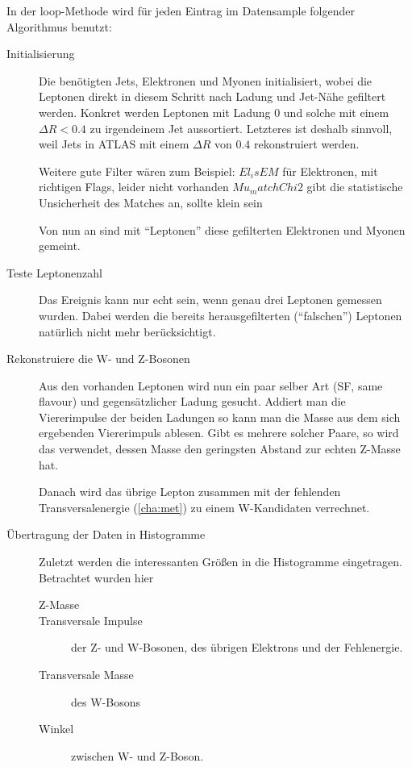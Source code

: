 In der loop-Methode wird für jeden Eintrag im Datensample folgender Algorithmus
benutzt:
\begin{description}
  \item[Initialisierung] Die benötigten Jets, Elektronen und Myonen
    initialisiert, wobei die Leptonen direkt in diesem Schritt nach Ladung und
    Jet-Nähe gefiltert werden. Konkret werden Leptonen mit Ladung 0 und solche
    mit einem $\Delta R < 0.4$ zu irgendeinem Jet aussortiert. Letzteres ist
    deshalb sinnvoll, weil Jets in ATLAS mit einem $\Delta R$ von $0.4$
    rekonstruiert werden.

    Weitere gute Filter wären zum Beispiel: $El_isEM$ für Elektronen, mit
    richtigen Flags, leider nicht vorhanden $Mu_matchChi2$ gibt die statistische
    Unsicherheit des Matches an, sollte klein sein

    Von nun an sind mit "`Leptonen"' diese gefilterten Elektronen und Myonen
    gemeint.

  \item[Teste Leptonenzahl] Das Ereignis kann nur echt sein, wenn genau drei
    Leptonen gemessen wurden. Dabei werden die bereits herausgefilterten
    ("`falschen"') Leptonen natürlich nicht mehr berücksichtigt.
    
  \item[Rekonstruiere die W- und Z-Bosonen] Aus den vorhanden Leptonen wird nun
    ein paar selber Art (SF, same flavour) und gegensätzlicher Ladung gesucht.
    Addiert man die Viererimpulse der beiden Ladungen so kann man die Masse aus
    dem sich ergebenden Viererimpuls ablesen. Gibt es mehrere solcher Paare, so
    wird das verwendet, dessen Masse den geringsten Abstand zur echten Z-Masse
    hat.

    Danach wird das übrige Lepton zusammen mit der fehlenden
    Transversalenergie (\ref{cha:met}) zu einem W-Kandidaten verrechnet.

  \item[Übertragung der Daten in Histogramme] Zuletzt werden die interessanten
    Größen in die Histogramme eingetragen. Betrachtet wurden hier

    \begin{description}
      \item[Z-Masse]
      \item[Transversale Impulse] der Z- und W-Bosonen, des übrigen Elektrons
        und der Fehlenergie.
      \item[Transversale Masse] des W-Bosons
      \item[Winkel] zwischen W- und Z-Boson.
    \end{description}
\end{description}

